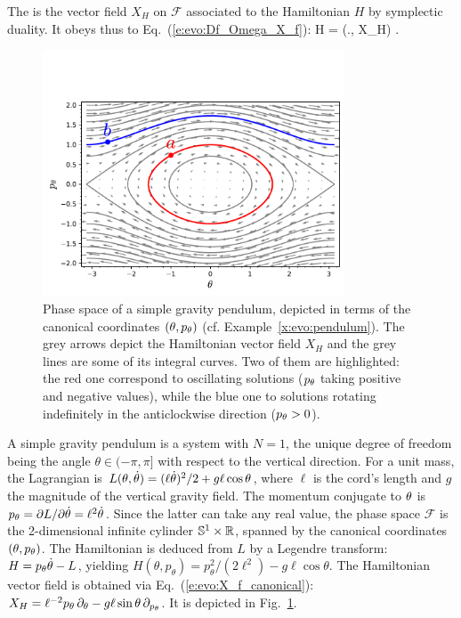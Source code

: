 The  is
the vector field $X_H$ on $\mathcal{F}$ associated to the Hamiltonian $H$
by symplectic duality. It obeys thus to Eq.~(\ref{e:evo:Df_Omega_X_f}):
\be
    \Dd H = \Omega(., X_H) .
\ee
\begin{figure}
\centerline{\includegraphics[width=0.8\textwidth]{evo_pendulum_phase.pdf}}
\caption[]{\label{f:evo:pendulum_phase} \footnotesize
Phase space of a simple gravity pendulum, depicted in terms of the
canonical coordinates $(\theta,p_\theta)$ (cf. Example~\ref{x:evo:pendulum}).
The grey arrows depict the Hamiltonian vector field $X_H$ and the grey
lines are some of its integral curves. Two of them are highlighted: the red
one correspond to oscillating solutions ($p_\theta$ taking positive and negative values), while the blue one to solutions
rotating indefinitely in the anticlockwise direction ($p_\theta>0$).}
\end{figure}

\begin{example}
\label{x:evo:pendulum}
A simple gravity pendulum is a system with $N=1$, the unique degree of
freedom being the angle $\theta\in(-\pi,\pi]$ with respect to the vertical direction.
For a unit mass, the Lagrangian is
$L(\theta,\dot{\theta}) = (\ell\dot{\theta})^2/2 + g \ell \cos\theta$,
where $\ell$ is the cord's length and $g$
the magnitude of the vertical gravity field. The momentum conjugate to $\theta$
is $p_\theta = {\partial L}/{\partial \dot{\theta}} = \ell^2\dot{\theta}$. Since the latter can
take any real value, the phase space $\mathcal{F}$ is the 2-dimensional infinite cylinder
$\mathbb{S}^1 \times \mathbb{R}$,
spanned by the canonical coordinates $(\theta,p_\theta)$. The
Hamiltonian is deduced from $L$ by a Legendre transform: $H = p_\theta \dot{\theta} - L$,
yielding
$H(\theta,p_\theta) = p_\theta^2 / (2\ell^2) - g\ell\cos\theta$.
The Hamiltonian vector field is obtained via Eq.~(\ref{e:evo:X_f_canonical}):
$X_H = \ell^{-2} p_\theta \, \partial_\theta - g \ell \sin\theta \, \partial_{p_\theta}$.
It is depicted in Fig.~\ref{f:evo:pendulum_phase}.
\end{example}

